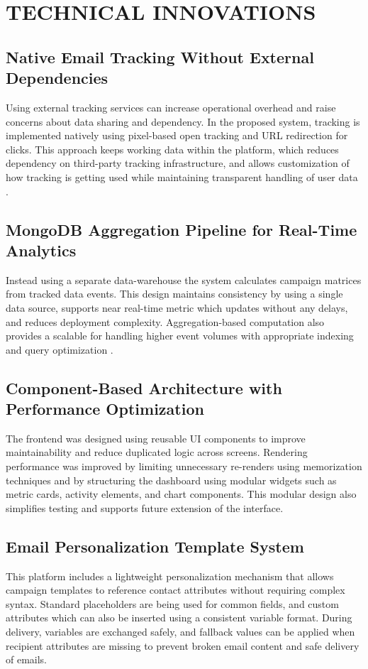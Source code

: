 \documentclass[12pt,journal,compsoc]{IEEEtran}
\begin{document}
\section{TECHNICAL INNOVATIONS}

\subsection{Native Email Tracking Without External Dependencies}
Using external tracking services can increase operational overhead and raise concerns about data sharing and dependency. In the proposed system, tracking is implemented natively using pixel-based open tracking and URL redirection for clicks. This approach keeps working data within the platform, which reduces dependency on third-party tracking infrastructure, and allows customization of how tracking is getting used while maintaining transparent handling of user data \cite{ref15,ref16}.

\subsection{MongoDB Aggregation Pipeline for Real-Time Analytics}
Instead using a separate data-warehouse the system calculates campaign matrices from tracked data events. This design maintains consistency by using a single data source, supports near real-time metric which updates without any delays, and reduces deployment complexity. Aggregation-based computation also provides a scalable for handling higher event volumes with appropriate indexing and query optimization \cite{ref18}.

\subsection{Component-Based Architecture with Performance Optimization}
The frontend was designed using reusable UI components to improve maintainability and reduce duplicated logic across screens. Rendering performance was improved by limiting unnecessary re-renders using memorization techniques and by structuring the dashboard using modular widgets such as metric cards, activity elements, and chart components. This modular design also simplifies testing and supports future extension of the interface.

\subsection{Email Personalization Template System}
This platform includes a lightweight personalization mechanism that allows campaign templates to reference contact attributes without requiring complex syntax. Standard placeholders are being used for common fields, and custom attributes which can also be inserted using a consistent variable format. During delivery, variables are exchanged safely, and fallback values can be applied when recipient attributes are missing to prevent broken email content and safe delivery of emails.
\end{document}
